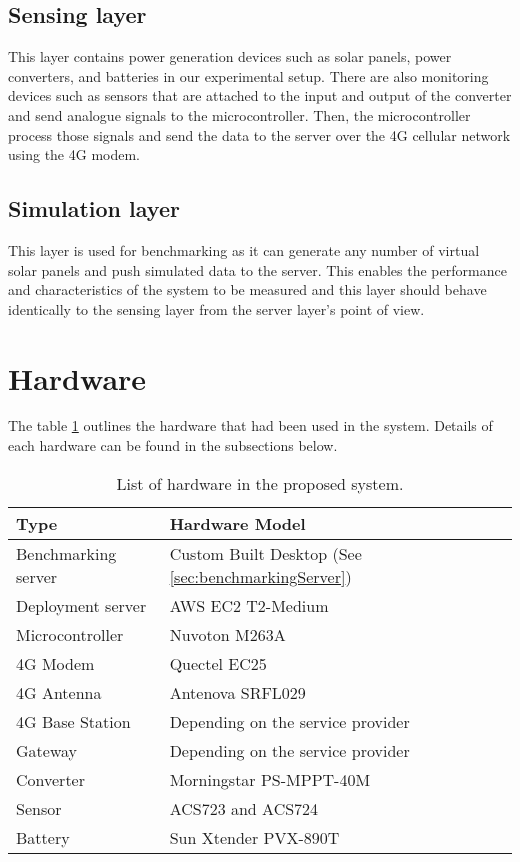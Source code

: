 \documentclass[../thesis.tex]{subfiles}
\begin{document}
\subsection{Sensing layer}

This layer contains power generation devices such as solar panels, power converters, and batteries in our experimental setup. There are also monitoring devices such as sensors that are attached to the input and output of the converter and send analogue signals to the microcontroller. Then, the microcontroller process those signals and send the data to the server over the 4G cellular network using the 4G modem.

\subsection{Simulation layer}

This layer is used for benchmarking as it can generate any number of virtual solar panels and push simulated data to the server. This enables the performance and characteristics of the system to be measured and this layer should behave identically to the sensing layer from the server layer's point of view.

\newpage
\section{Hardware}

The table \ref{tab:hardwareList} outlines the hardware that had been used in the system. Details of each hardware can be found in the subsections below.

\begin{table}[h!]
\begin{center}
\caption{List of hardware in the proposed system.}
\label{tab:hardwareList}
\begin{tabular}{l|l}
\toprule
\textbf{Type} & \textbf{Hardware Model}\\
\midrule
Benchmarking server & Custom Built Desktop (See \autoref{sec:benchmarkingServer})\\
Deployment server & AWS EC2 T2-Medium\\
Microcontroller & Nuvoton M263A\\
4G Modem & Quectel EC25\\
4G Antenna & Antenova SRFL029\\
4G Base Station & Depending on the service provider\\
Gateway & Depending on the service provider\\
Converter & Morningstar PS-MPPT-40M\\
Sensor & ACS723 and ACS724\\
Battery & Sun Xtender PVX-890T\\
\bottomrule
\end{tabular}
\end{center}
\end{table}
\end{document}
